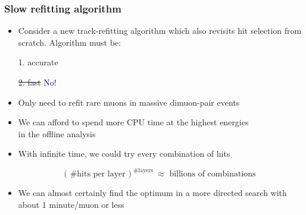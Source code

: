 \documentclass[compress]{beamer}
\begin{document}
\begin{frame}
\frametitle{Slow refitting algorithm}

\begin{itemize}\setlength{\itemsep}{0.35 cm}
\item Consider a new track-refitting algorithm which also revisits hit selection from scratch.  Algorithm must be:

\vspace{0.1 cm}
\hspace{0.5 cm} 1. accurate

\hspace{0.5 cm} \sout{2. fast} \hspace{0.1 cm} \textcolor{darkblue}{No!}

\item Only need to refit rare muons in massive dimuon-pair events

\item We can afford to spend more CPU time at the highest energies \\ in the offline analysis

\item With infinite time, we could try every combination of hits

\[ \big( \mbox{ \#hits per layer } \big)^{ \mbox{ \#layers } } \approx \mbox{ billions of combinations }\]

\item We can almost certainly find the optimum in a more directed search with about 1 minute/muon or less
\end{itemize}
\end{frame}
\end{document}

